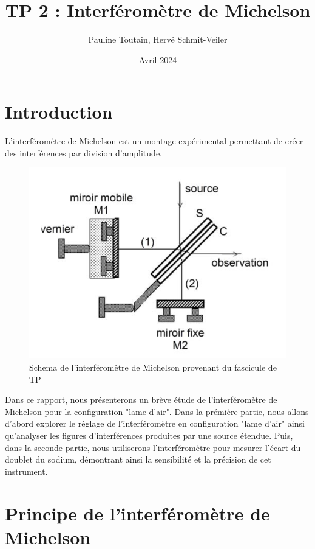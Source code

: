 \documentclass{article}
\title{\textbf{TP 2 : Interféromètre de Michelson}}
\author{Pauline Toutain, Hervé Schmit-Veiler}
\date{Avril 2024}
\begin{document}
\maketitle

\section{Introduction}

L'interféromètre de Michelson est un montage expérimental permettant de créer des interférences 
par division d'amplitude.

\begin{figure}[H]
    \centering
    \includegraphics[width=0.5\linewidth]{figs/michelson.png}
    \caption{Schema de l'interféromètre de Michelson provenant du fascicule de TP}
    \label{fig:michelson}
\end{figure}


Dans ce rapport, nous présenterons un brève étude de l'interféromètre de Michelson pour la configuration 
"lame d'air". Dans la prémière partie, nous allons d'abord explorer le réglage de l'interféromètre en configuration "lame d'air" ainsi qu'analyser
les figures d'interférences produites par une source étendue. Puis, dans la seconde partie, nous 
utiliserons l'interféromètre pour mesurer l'écart du doublet du sodium, démontrant ainsi la sensibilité et 
la précision de cet instrument. 

\section{Principe de l'interféromètre de Michelson}
\end{document}
